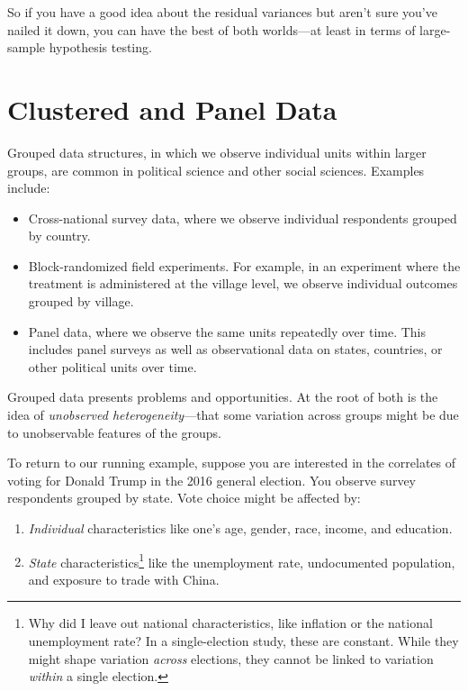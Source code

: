 \documentclass[12pt,oneside,openany]{book}
\begin{document}
So if you have a good idea about the residual variances but aren't sure
you've nailed it down, you can have the best of both worlds---at least
in terms of large-sample hypothesis testing.

\chapter{Clustered and Panel Data}\label{panel}

Grouped data structures, in which we observe individual units within
larger groups, are common in political science and other social
sciences. Examples include:

\begin{itemize}
\item
  Cross-national survey data, where we observe individual respondents
  grouped by country.
\item
  Block-randomized field experiments. For example, in an experiment
  where the treatment is administered at the village level, we observe
  individual outcomes grouped by village.
\item
  Panel data, where we observe the same units repeatedly over time. This
  includes panel surveys as well as observational data on states,
  countries, or other political units over time.
\end{itemize}

Grouped data presents problems and opportunities. At the root of both is
the idea of \emph{unobserved heterogeneity}---that some variation across
groups might be due to unobservable features of the groups.

To return to our running example, suppose you are interested in the
correlates of voting for Donald Trump in the 2016 general election. You
observe survey respondents grouped by state. Vote choice might be
affected by:

\begin{enumerate}
\def\labelenumi{\arabic{enumi}.}
\item
  \emph{Individual} characteristics like one's age, gender, race,
  income, and education.
\item
  \emph{State} characteristics\footnote{Why did I leave out national
    characteristics, like inflation or the national unemployment rate?
    In a single-election study, these are constant. While they might
    shape variation \emph{across} elections, they cannot be linked to
    variation \emph{within} a single election.} like the unemployment
  rate, undocumented population, and exposure to trade with China.
\end{enumerate}
\end{document}
